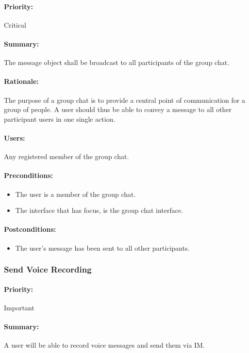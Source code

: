 \documentclass[11pt]{article}
\begin{document}
\paragraph{Priority:} Critical
\paragraph{Summary:} The message object shall be broadcast to all participants of the group chat.
\paragraph{Rationale:} The purpose of a group chat is to provide a central point of communication for a group of people. A user should thus be able to convey a message to all other participant users in one single action.
\paragraph{Users:} Any registered member of the group chat.
\paragraph{Preconditions:} 
\begin{itemize}
\item The user is a member of the group chat.
\item The interface that has focus, is the group chat interface.
\end{itemize}
\paragraph{{Postconditions:}}
\begin{itemize}
\item The user's message has been sent to all other participants.
\end{itemize}
\subsubsection{Send Voice Recording} \label{UC-send-voice}
\paragraph{Priority:} Important
\paragraph{Summary:} A user will be able to record voice messages and send them via IM.
\end{document}

